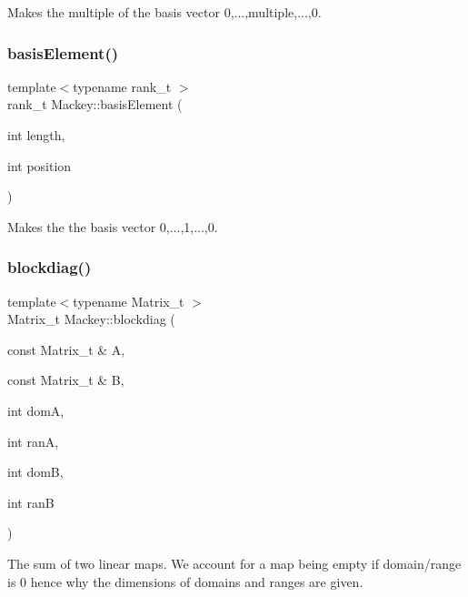 Makes the multiple of the basis vector 0,...,multiple,...,0. 

\mbox{\label{namespaceMackey_aa10c6cbea565e024a38b446139800b69}} 
\subsubsection{\texorpdfstring{basis\+Element()}{basisElement()}\hspace{0.1cm}{\footnotesize\ttfamily [2/2]}}
{\footnotesize\ttfamily template$<$typename rank\+\_\+t $>$ \\
rank\+\_\+t Mackey\+::basis\+Element (\begin{DoxyParamCaption}\item[{int}]{length,  }\item[{int}]{position }\end{DoxyParamCaption})\hspace{0.3cm}{\ttfamily [inline]}}



Makes the the basis vector 0,...,1,...,0. 

\mbox{\label{namespaceMackey_a6d2d912037da84c6884ac62db997cc0f}} 
\subsubsection{\texorpdfstring{blockdiag()}{blockdiag()}\hspace{0.1cm}{\footnotesize\ttfamily [1/2]}}
{\footnotesize\ttfamily template$<$typename Matrix\+\_\+t $>$ \\
Matrix\+\_\+t Mackey\+::blockdiag (\begin{DoxyParamCaption}\item[{const Matrix\+\_\+t \&}]{A,  }\item[{const Matrix\+\_\+t \&}]{B,  }\item[{int}]{domA,  }\item[{int}]{ranA,  }\item[{int}]{domB,  }\item[{int}]{ranB }\end{DoxyParamCaption})}



The sum of two linear maps. We account for a map being empty if domain/range is 0 hence why the dimensions of domains and ranges are given. 

